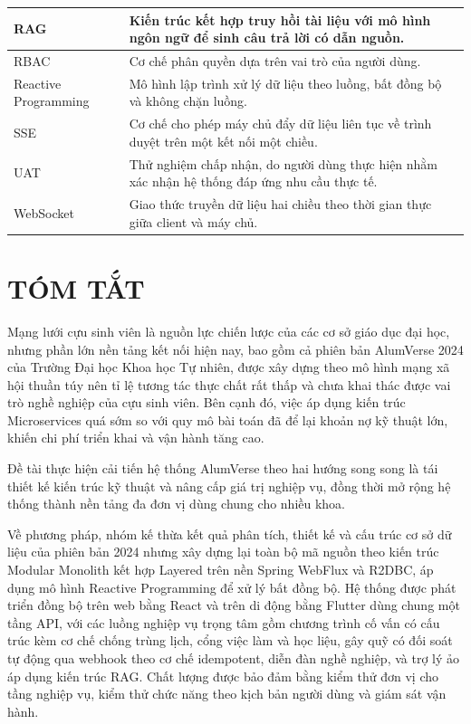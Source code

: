 \documentclass[12pt,a4paper,oneside]{report}
\begin{document}
\begin{longtable}{|>{\raggedright\arraybackslash}p{3.2cm}|>{\raggedright\arraybackslash}p{11.3cm}|}
RAG & Kiến trúc kết hợp truy hồi tài liệu với mô hình ngôn ngữ để sinh câu trả lời có dẫn nguồn. \\ \hline
RBAC & Cơ chế phân quyền dựa trên vai trò của người dùng. \\ \hline
Reactive Programming & Mô hình lập trình xử lý dữ liệu theo luồng, bất đồng bộ và không chặn luồng. \\ \hline
SSE & Cơ chế cho phép máy chủ đẩy dữ liệu liên tục về trình duyệt trên một kết nối một chiều. \\ \hline
UAT & Thử nghiệm chấp nhận, do người dùng thực hiện nhằm xác nhận hệ thống đáp ứng nhu cầu thực tế. \\ \hline
WebSocket & Giao thức truyền dữ liệu hai chiều theo thời gian thực giữa client và máy chủ. \\ \hline
\end{longtable}
\renewcommand{\arraystretch}{1}

\newpage
\chapter*{TÓM TẮT}

Mạng lưới cựu sinh viên là nguồn lực chiến lược của các cơ sở giáo dục đại học, nhưng phần lớn nền tảng kết nối hiện nay, bao gồm cả phiên bản AlumVerse 2024 của Trường Đại học Khoa học Tự nhiên, được xây dựng theo mô hình mạng xã hội thuần túy nên tỉ lệ tương tác thực chất rất thấp và chưa khai thác được vai trò nghề nghiệp của cựu sinh viên. Bên cạnh đó, việc áp dụng kiến trúc Microservices quá sớm so với quy mô bài toán đã để lại khoản nợ kỹ thuật lớn, khiến chi phí triển khai và vận hành tăng cao.

Đề tài thực hiện cải tiến hệ thống AlumVerse theo hai hướng song song là tái thiết kế kiến trúc kỹ thuật và nâng cấp giá trị nghiệp vụ, đồng thời mở rộng hệ thống thành nền tảng đa đơn vị dùng chung cho nhiều khoa.

Về phương pháp, nhóm kế thừa kết quả phân tích, thiết kế và cấu trúc cơ sở dữ liệu của phiên bản 2024 nhưng xây dựng lại toàn bộ mã nguồn theo kiến trúc Modular Monolith kết hợp Layered trên nền Spring WebFlux và R2DBC, áp dụng mô hình Reactive Programming để xử lý bất đồng bộ. Hệ thống được phát triển đồng bộ trên web bằng React và trên di động bằng Flutter dùng chung một tầng API, với các luồng nghiệp vụ trọng tâm gồm chương trình cố vấn có cấu trúc kèm cơ chế chống trùng lịch, cổng việc làm và học liệu, gây quỹ có đối soát tự động qua webhook theo cơ chế idempotent, diễn đàn nghề nghiệp, và trợ lý ảo áp dụng kiến trúc RAG. Chất lượng được bảo đảm bằng kiểm thử đơn vị cho tầng nghiệp vụ, kiểm thử chức năng theo kịch bản người dùng và giám sát vận hành.
\end{document}
